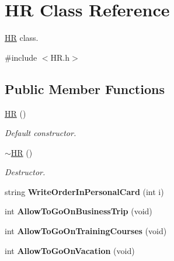 \hypertarget{class_h_r}{}\section{HR Class Reference}
\label{class_h_r}


\hyperlink{class_h_r}{HR} class.  




{\ttfamily \#include $<$H\+R.\+h$>$}

\subsection*{Public Member Functions}
\begin{DoxyCompactItemize}
\item 
\mbox{\label{class_h_r_a0cb187ef9d2c057d44e9bfcb679eed27}} 
\hyperlink{class_h_r_a0cb187ef9d2c057d44e9bfcb679eed27}{HR} ()
\begin{DoxyCompactList}\small\item\em Default constructor. \end{DoxyCompactList}\item 
\mbox{\label{class_h_r_a23fb380ea282a4193a7f05f81506c779}} 
\hyperlink{class_h_r_a23fb380ea282a4193a7f05f81506c779}{$\sim$\+HR} ()
\begin{DoxyCompactList}\small\item\em Destructor. \end{DoxyCompactList}\item 
\mbox{\label{class_h_r_a3c509dc4449f8406ebd4bac482a8b50c}} 
string {\bfseries Write\+Order\+In\+Personal\+Card} (int i)
\item 
\mbox{\label{class_h_r_af3a791db3d60be02234605865c0979da}} 
int {\bfseries Allow\+To\+Go\+On\+Business\+Trip} (void)
\item 
\mbox{\label{class_h_r_a1a6f8313fedc1e0ad25827b35cb80427}} 
int {\bfseries Allow\+To\+Go\+On\+Training\+Courses} (void)
\item 
\mbox{\label{class_h_r_a890c8452142fee7556b7498785f10b6f}} 
int {\bfseries Allow\+To\+Go\+On\+Vacation} (void)
\item 
\mbox{\label{class_h_r_a7f7c6e9ee2f6010fbf53ceb94d18ddfb}} 

\end{DoxyCompactItemize}
